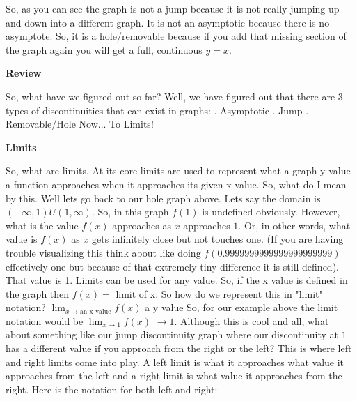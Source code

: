 \documentclass{article}
\begin{document}
So, as you can see the graph is not a jump because it is not really jumping up and down into a different graph. It is not an asymptotic because there is no asymptote. So, it is a hole/removable because if you add that missing section of the graph again you will get a full, continuous $y=x$.
\begin{center}
    \textbf{Review}
\end{center}
So, what have we figured out so far? Well, we have figured out that there are 3 types of discontinuities that can exist in graphs:
\newline
{}. Asymptotic
\newline
{}. Jump
\newline
{}. Removable/Hole
\newline
\newline
Now... To Limits!
\begin{center}
    \textbf{Limits}
\end{center}
So, what are limits. At its core limits are used to represent what a graph y value a function approaches when it approaches its given x value. So, what do I mean by this. Well lets go back to our hole graph above. Lets say the domain is $(-\infty, 1) U (1, \infty)$. So, in this graph $f(1)$ is undefined obviously. However, what is the value $f(x)$ approaches as $x$ approaches $1$. Or, in other words, what value is $f(x)$ as $x$ gets infinitely close but not touches one. (If you are having trouble visualizing this think about like doing $f(0.9999999999999999999999)$ effectively one but because of that extremely tiny difference it is still defined). That value is 1. Limits can be used for any value. So, if the x value is defined in the graph then $f(x) = $ limit of x. So how do we represent this in "limit" notation?
\newline
\newline
$\lim_{x\to \text{an x value}} f(x)$ a y value 
\newline
\newline
So, for our example above the limit notation would be $\lim_{x\to1} f(x)$ $\to1$.
\newline
\newline
Although this is cool and all, what about something like our jump discontinuity graph where our discontinuity at $1$ has a different value if you approach from the right or the left? This is where left and right limits come into play. A left limit is what it approaches what value it approaches from the left and a right limit is what value it approaches from the right. Here is the notation for both left and right:
\end{document}
